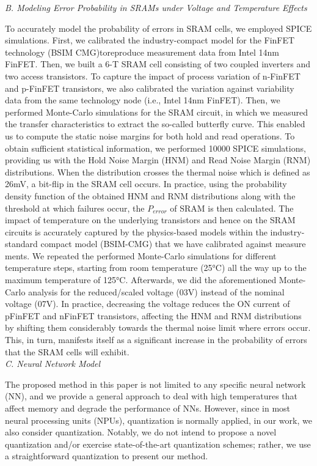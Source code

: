 \documentclass[sigconf]{acmart}
\begin{document}
\noindent \textit{B. Modeling Error Probability in SRAMs under Voltage and Temperature Effects} 

To accurately model the probability of errors in SRAM cells, we employed SPICE simulations. First, we calibrated the industry-compact model for the FinFET technology (BSIM CMG)toreproduce measurement data from Intel 14nm FinFET. Then, we built a 6-T SRAM cell consisting of two coupled inverters and two access transistors. To capture the impact of process variation of n-FinFET and p-FinFET transistors, we also calibrated the variation against variability data from the same technology node (i.e., Intel 14nm FinFET). Then, we performed Monte-Carlo simulations for the SRAM circuit, in which we measured the transfer characteristics to extract the so-called butterfly curve. This enabled us to compute the static noise margins for both hold and read operations. To obtain sufficient statistical information, we performed 10000 SPICE simulations, providing us with the Hold Noise Margin (HNM) and Read Noise Margin (RNM) distributions. When the distribution crosses the thermal noise which is defined as 26mV, a bit-flip in the SRAM cell occurs. In practice, using the probability density function of the obtained HNM and RNM distributions along with the threshold at which failures occur, the $P_{error}$ of SRAM is then calculated. The impact of temperature on the underlying transistors and hence on the SRAM circuits is accurately captured by the physics-based models within the industry-standard compact model (BSIM-CMG) that we have calibrated against measure ments. We repeated the performed Monte-Carlo simulations for different temperature steps, starting from room temperature (25°C) all the way up to the maximum temperature of 125°C. Afterwards, we did the aforementioned Monte-Carlo analysis for the reduced/scaled voltage (03V) instead of the nominal voltage (07V). In practice, decreasing the voltage reduces the ON current of pFinFET and nFinFET transistors, affecting the HNM and RNM distributions by shifting them considerably towards the thermal noise limit where errors occur. This, in turn, manifests itself as a significant increase in the probability of errors that the SRAM cells will exhibit.\\

\noindent \textit{C. Neural Network Model}

The proposed method in this paper is not limited to any specific neural network (NN), and we provide a general approach to deal with high temperatures that affect memory and degrade the performance of NNs. However, since in most neural processing units (NPUs), quantization is normally applied, in our work, we also consider quantization. Notably, we do not intend to propose a novel quantization and/or exercise state-of-the-art quantization schemes; rather, we use a straightforward quantization to present our method.
\end{document}
